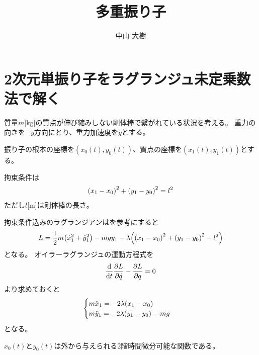 \documentclass[uplatex]{jsarticle}
\title{多重振り子}
\author{中山 大樹}
\begin{document}
\maketitle

\section{2次元単振り子をラグランジュ未定乗数法で解く}

質量$m$[\si{kg}]の質点が伸び縮みしない剛体棒で繋がれている状況を考える。
重力の向きを$-y$方向にとり、重力加速度を$g$とする。

振り子の根本の座標を$(x_0(t), y_0(t))$、質点の座標を$(x_1(t), y_1(t))$とする。

拘束条件は
\begin{align}
    \qty(x_1 - x_0)^2 + \qty(y_1 - y_0)^2 = l^2  \label{2d_single_cons}
\end{align}
ただし$l$[\si{m}]は剛体棒の長さ。

拘束条件込みのラグランジアンは\cite{a}を参考にすると
\begin{align}
    L = \frac{1}{2} m \qty(\dot{x}_1^2 + \dot{y}_1^2) - mgy_1
        - \lambda \qty(\qty(x_1 - x_0)^2 + \qty(y_1 - y_0)^2 - l^2)
\end{align}
となる。
オイラーラグランジュの運動方程式を
\begin{align}
    \dv{}{t}\pdv{L}{\dot{q}} - \pdv{L}{q} = 0
\end{align}
より求めておくと
\begin{align}
\begin{cases}
    m \ddot{x}_1 = -2\lambda\qty(x_1 - x_0) \\
    m \ddot{y}_1 = -2\lambda\qty(y_1 - y_0) - mg
\end{cases}
\label{2d_single_eom}
\end{align}
となる。

$x_0(t)$と$y_0(t)$は外から与えられる2階時間微分可能な関数である。
\end{document}
